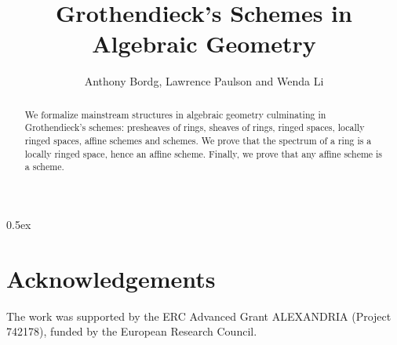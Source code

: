 \documentclass[11pt,a4paper]{article}
\begin{document}
\title{Grothendieck's Schemes in Algebraic Geometry}
\author{Anthony Bordg, Lawrence Paulson and Wenda Li}
\maketitle

\begin{abstract}
  We formalize mainstream structures in algebraic geometry \cite{hartshorne2013algebraic,lang2005algebra} culminating in Grothendieck's schemes: presheaves of rings, sheaves of rings, ringed spaces, locally ringed spaces, affine schemes and schemes. We prove that the spectrum of a ring is a locally ringed space, hence an affine scheme. Finally, we prove that any affine scheme is a scheme.
\end{abstract}

\tableofcontents

\parindent 0pt\parskip 0.5ex



\section{Acknowledgements}
The work was supported by the ERC Advanced Grant ALEXANDRIA (Project 742178), funded by the European Research Council.



\end{document}
